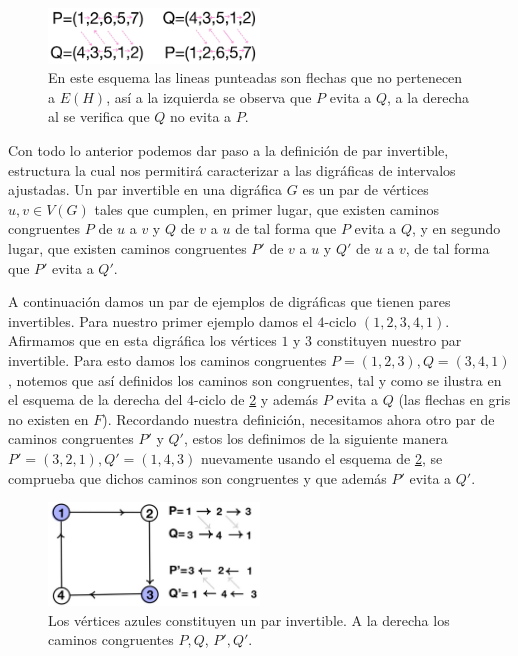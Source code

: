 \begin{figure}[H]
  \centering
  \includegraphics[width=0.5\textwidth]{recursos/capturas/Esqm.jpg}
  \caption{En este esquema las lineas punteadas son flechas que no pertenecen a $E(H)$, así a la izquierda se observa que $P$ evita a $Q$, a la derecha al se verifica que $Q$ no evita a $P$.}
  \label{fig:Esqm}
\end{figure}

Con todo lo anterior podemos dar paso a la definición de par invertible, estructura la cual nos permitirá caracterizar a las digráficas de intervalos ajustadas. Un par invertible en una digráfica $G$ es un par de vértices $u,v \in V(G)$ tales que cumplen, en primer lugar, que existen caminos congruentes $P$ de $u$ a $v$ y $Q$ de $v$ a $u$ de tal forma que $P$ evita a $Q$, y en segundo lugar, que existen caminos congruentes $P'$ de $v$ a $u$ y $Q'$ de $u$ a $v$, de tal forma que $P'$ evita a $Q'$.

A continuación damos un par de ejemplos de digráficas que tienen pares invertibles. Para nuestro primer ejemplo damos el $4$-ciclo $(1,2,3,4,1)$. Afirmamos que en esta digráfica los vértices $1$ y $3$ constituyen nuestro par invertible. Para esto damos los caminos congruentes $P=(1,2,3), Q=(3,4,1)$, notemos que así definidos los caminos son congruentes, tal y como se ilustra en el esquema de la derecha del $4$-ciclo de \cref{fig:InvrtblPair01} y además $P$ evita a $Q$ (las flechas en gris no existen en $F$). Recordando nuestra definición, necesitamos ahora otro par de caminos congruentes $P'$ y $Q'$, estos los definimos de la siguiente manera $P'=(3,2,1), Q'=(1,4,3)$ nuevamente usando el esquema de \cref{fig:InvrtblPair01}, se comprueba que dichos caminos son congruentes y que además $P'$ evita a $Q'$.

\begin{figure}[H]
  \centering
  \includegraphics[width=0.5\textwidth]{recursos/capturas/InvtblPair01.jpg}
  \caption{Los vértices azules constituyen un par invertible. A la derecha los caminos congruentes $P,Q$, $P',Q'$.}
  \label{fig:InvrtblPair01}
\end{figure}

